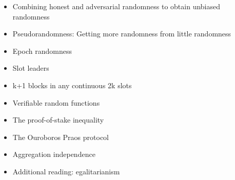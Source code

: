 



{\color{red}
\begin{itemize}
\item Combining honest and adversarial randomness to obtain unbiased randomness
\item Pseudorandomness: Getting more randomness from little randomness
\item Epoch randomness
\item Slot leaders
\item k+1 blocks in any continuous 2k slots
\item Verifiable random functions
\item The proof-of-stake inequality
\item The Ouroboros Praos protocol
\item Aggregation independence
\item Additional reading: egalitarianism
\end{itemize}
}

